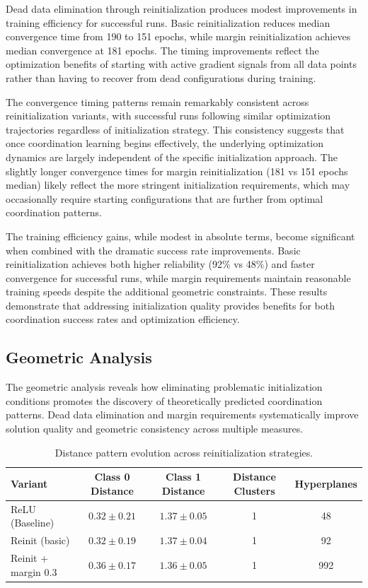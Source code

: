 Dead data elimination through reinitialization produces modest improvements in training efficiency for successful runs. Basic reinitialization reduces median convergence time from 190 to 151 epochs, while margin reinitialization achieves median convergence at 181 epochs. The timing improvements reflect the optimization benefits of starting with active gradient signals from all data points rather than having to recover from dead configurations during training.

The convergence timing patterns remain remarkably consistent across reinitialization variants, with successful runs following similar optimization trajectories regardless of initialization strategy. This consistency suggests that once coordination learning begins effectively, the underlying optimization dynamics are largely independent of the specific initialization approach. The slightly longer convergence times for margin reinitialization (181 vs 151 epochs median) likely reflect the more stringent initialization requirements, which may occasionally require starting configurations that are further from optimal coordination patterns.

The training efficiency gains, while modest in absolute terms, become significant when combined with the dramatic success rate improvements. Basic reinitialization achieves both higher reliability (92\% vs 48\%) and faster convergence for successful runs, while margin requirements maintain reasonable training speeds despite the additional geometric constraints. These results demonstrate that addressing initialization quality provides benefits for both coordination success rates and optimization efficiency.


\subsection*{Geometric Analysis}

The geometric analysis reveals how eliminating problematic initialization conditions promotes the discovery of theoretically predicted coordination patterns. Dead data elimination and margin requirements systematically improve solution quality and geometric consistency across multiple measures.

\begin{table}[ht]
\centering
\caption{Distance pattern evolution across reinitialization strategies.}
\label{tab:relu1-reinit-distance}
\begin{tabular}{lcccc}
\toprule
Variant & Class 0 Distance & Class 1 Distance & Distance Clusters & Hyperplanes \\
\midrule
ReLU (Baseline) & $0.32 \pm 0.21$ & $1.37 \pm 0.05$ & 1 & 48 \\
Reinit (basic) & $0.32 \pm 0.19$ & $1.37 \pm 0.04$ & 1 & 92 \\
Reinit + margin 0.3 & $0.36 \pm 0.17$ & $1.36 \pm 0.05$ & 1 & 992 \\
\bottomrule
\end{tabular}
\end{table}

